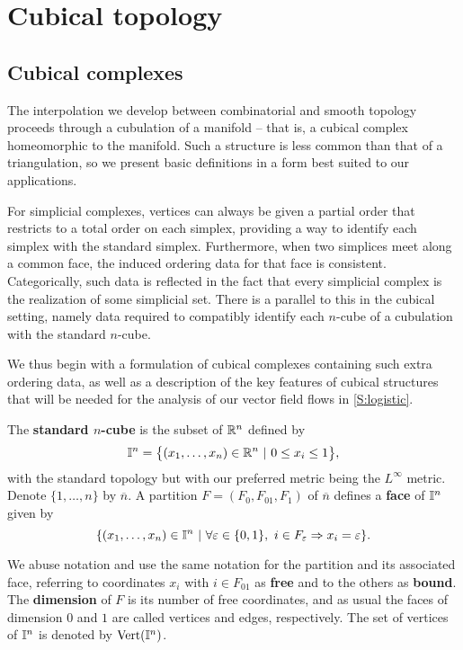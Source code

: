 
\section{Cubical topology}\label{S:cubical topology}

\subsection{Cubical complexes}\label{cubicalcomplexes}

The interpolation we develop between combinatorial and smooth topology proceeds through a cubulation of a manifold -- that is, a cubical complex homeomorphic to the manifold.
Such a structure is less common than that of a triangulation, so we present basic definitions in a form best suited to our applications.

For simplicial complexes, vertices can always be given a partial order that restricts to a total order on each simplex, providing a way to identify each simplex with the standard simplex.
Furthermore, when two simplices meet along a common face, the induced ordering data for that face is consistent.
Categorically, such data is reflected in the fact that every simplicial complex is the realization of some simplicial set.
There is a parallel to this in the cubical setting, namely data required to compatibly identify each $n$-cube of a cubulation with the standard $n$-cube.

We thus begin with a formulation of cubical complexes containing such extra ordering data, as well as a description of the key features of cubical structures that will be needed for the analysis of our vector field flows in \cref{S:logistic}.

The \textbf{standard $n$-cube} is the subset of $\mathbb{R}^n$ defined by
\[
\mathbb{I}^n = \big\{ (x_1, \dots, x_n) \in \mathbb{R}^n\ |\ 0 \leq x_i \leq 1 \big\},
\]
with the standard topology but with our preferred metric being the $L^\infty$ metric.
Denote $\{1, \dots, n\}$ by $\overline{n}$.
A partition $F = (F_0, F_{01}, F_1)$ of $\overline n$ defines a \textbf{face} of $\mathbb{I}^n$ given by
\[
\{(x_1, \dots, x_n) \in \mathbb{I}^n\ |\ \forall \varepsilon \in \{0, 1\},\ i \in F_\varepsilon \Rightarrow x_i = \varepsilon\}.
\]

We abuse notation and use the same notation for the partition and its associated face, referring to coordinates $x_i$ with $i \in F_{01}$ as \textbf{free}
and to the others as \textbf{bound}.
The \textbf{dimension} of $F$ is its number of free coordinates, and as usual the faces of dimension $0$ and $1$ are called vertices and edges, respectively.
The set of vertices of $\mathbb{I}^n$ is denoted by ${\rm Vert}(\mathbb{I}^n)$.

